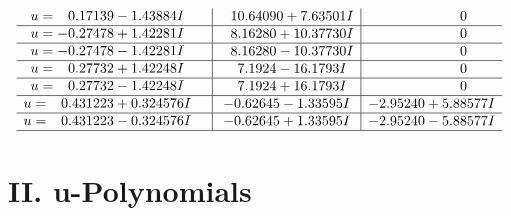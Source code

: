 \documentclass[1p]{elsarticle_modified}
\theoremstyle{definition}
\begin{document}
$$\begin{array}{c|c|c}
\begin{aligned}
u &= \phantom{-}0.17139 - 1.43884 I\end{aligned}
 & \phantom{-}10.64090 + 7.63501 I & \phantom{-0.000000 } 0 \\ \hline\begin{aligned}
u &= -0.27478 + 1.42281 I\end{aligned}
 & \phantom{-}8.16280 + 10.37730 I & \phantom{-0.000000 } 0 \\ \hline\begin{aligned}
u &= -0.27478 - 1.42281 I\end{aligned}
 & \phantom{-}8.16280 - 10.37730 I & \phantom{-0.000000 } 0 \\ \hline\begin{aligned}
u &= \phantom{-}0.27732 + 1.42248 I\end{aligned}
 & \phantom{-}7.1924 - 16.1793 I & \phantom{-0.000000 } 0 \\ \hline\begin{aligned}
u &= \phantom{-}0.27732 - 1.42248 I\end{aligned}
 & \phantom{-}7.1924 + 16.1793 I & \phantom{-0.000000 } 0 \\ \hline\begin{aligned}
u &= \phantom{-}0.431223 + 0.324576 I\end{aligned}
 & -0.62645 - 1.33595 I & -2.95240 + 5.88577 I \\ \hline\begin{aligned}
u &= \phantom{-}0.431223 - 0.324576 I\end{aligned}
 & -0.62645 + 1.33595 I & -2.95240 - 5.88577 I\\
 \hline 
 \end{array}$$\newpage
\newpage\renewcommand{\arraystretch}{1}
\centering \section*{ II. u-Polynomials}
\end{document}
